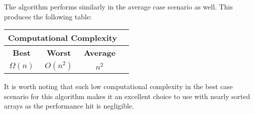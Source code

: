 The algorithm performs similarly in the average case scenario as well. This produces the following table:

\begin{table}[h]
    \centering
    \begin{tabular}{|c|c|c|c|}
        \hline
        \multicolumn{3}{|c|}{Computational Complexity} \\
        \hline
        \textbf{Best} & \textbf{Worst} & \textbf{Average} \\
        \hline
        \small$\Omega(n)$ & \small$O(n^2)$ & \small$n^2$ \\
        \hline
    \end{tabular}
\end{table}

It is worth noting that such low computational complexity in the best case scenario for this algorithm makes it an excellent choice to use with nearly sorted arrays as the performance hit is negligible.
